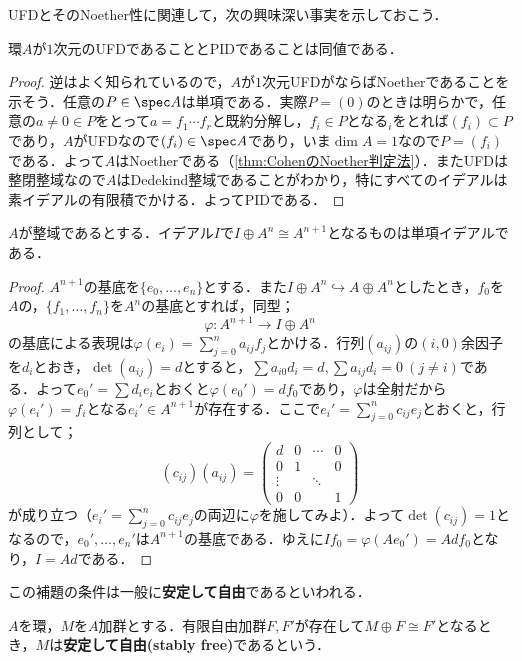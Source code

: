 UFDとそのNoether性に関連して，次の興味深い事実を示しておこう．

\begin{prop}
	環$A$が$1$次元のUFDであることとPIDであることは同値である．
\end{prop}

\begin{proof}
	逆はよく知られているので，$A$が$1$次元UFDがならばNoetherであることを示そう．任意の$P\in\spec A$は単項である．実際$P=(0)$のときは明らかで，任意の$a\neq 0\in P$をとって$a=f_1\cdots f_r$と既約分解し，$f_i\in P$となる$_i$をとれば$(f_i)\subset P$であり，$A$がUFDなので$(f_i)\in\spec A$であり，いま$\dim A=1$なので$P=(f_i)$である．よって$A$はNoetherである（\ref{thm:CohenのNoether判定法}）．またUFDは整閉整域なので$A$はDedekind整域であることがわかり，特にすべてのイデアルは素イデアルの有限積でかける．よってPIDである．
\end{proof}
\begin{lem}\label{lem:安定して自由でrank1なら単項}
	$A$が整域であるとする．イデアル$I$で$I\oplus A^n\cong A^{n+1}$となるものは単項イデアルである．
\end{lem}

\begin{proof}
	$A^{n+1}$の基底を$\{e_0,\dots,e_n\}$とする．また$I\oplus A^n\hookrightarrow A\oplus A^{n}$としたとき，$f_0$を$A$の，$\{f_1,\dots,f_n\}$を$A^n$の基底とすれば，同型；
	\[\varphi:A^{n+1}\to I\oplus A^n\]
	の基底による表現は$\varphi(e_i)=\sum_{j=0}^n a_{ij}f_j$とかける．行列$(a_{ij})$の$(i,0)$余因子を$d_i$とおき，$\det (a_{ij})=d$とすると，$\sum a_{i0}d_i=d,\sum a_{ij}d_i=0~(j\neq i)$である．よって$e_0'=\sum d_ie_i$とおくと$\varphi(e_0')=df_0$であり，$\varphi$は全射だから$\varphi(e_i')=f_i$となる$e_i'\in A^{n+1}$が存在する．ここで$e_i'=\sum_{j=0}^n c_{ij}e_j$とおくと，行列として；
	\[(c_{ij})(a_{ij})=
	\begin{pmatrix}
		d&0&\cdots&0\\
		0&1&&0\\
		\vdots&&\ddots\\
		0&0&&1
	\end{pmatrix}\]
	が成り立つ（$e_i'=\sum_{j=0}^n c_{ij}e_j$の両辺に$\varphi$を施してみよ）．よって$\det (c_{ij})=1$となるので，$e_0',\dots,e_n'$は$A^{n+1}$の基底である．ゆえに$If_0=\varphi(Ae_0')=Ad f_0$となり，$I=Ad$である．
\end{proof}
この補題の条件は一般に\textbf{安定して自由}であるといわれる．

\begin{defi}[安定して自由]
	$A$を環，$M$を$A$加群とする．有限自由加群$F,F'$が存在して$M\oplus F\cong F'$となるとき，$M$は\textbf{安定して自由(stably free)}であるという．
\end{defi}

